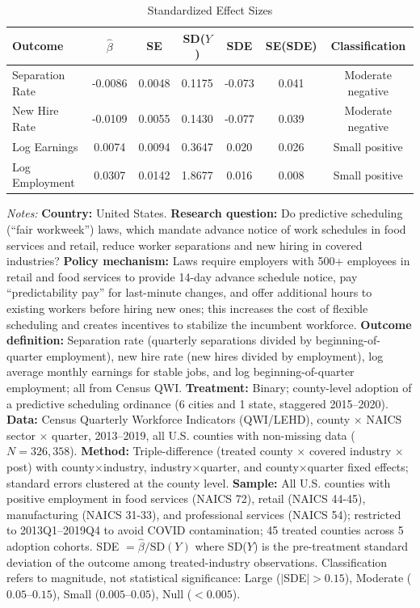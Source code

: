 \begin{table}[htbp]
\centering
\caption{Standardized Effect Sizes}
\label{tab:sde}
\begin{threeparttable}
\begin{tabular}{lcccccc}
\toprule
Outcome & $\hat{\beta}$ & SE & SD($Y$) & SDE & SE(SDE) & Classification \\
\midrule
Separation Rate & -0.0086 & 0.0048 & 0.1175 & -0.073 & 0.041 & Moderate negative \\
New Hire Rate & -0.0109 & 0.0055 & 0.1430 & -0.077 & 0.039 & Moderate negative \\
Log Earnings & 0.0074 & 0.0094 & 0.3647 & 0.020 & 0.026 & Small positive \\
Log Employment & 0.0307 & 0.0142 & 1.8677 & 0.016 & 0.008 & Small positive \\
\bottomrule
\end{tabular}
\begin{tablenotes}[flushleft]\small
\item \textit{Notes:} \textbf{Country:} United States. \textbf{Research question:} Do predictive scheduling (``fair workweek'') laws, which mandate advance notice of work schedules in food services and retail, reduce worker separations and new hiring in covered industries? \textbf{Policy mechanism:} Laws require employers with 500+ employees in retail and food services to provide 14-day advance schedule notice, pay ``predictability pay'' for last-minute changes, and offer additional hours to existing workers before hiring new ones; this increases the cost of flexible scheduling and creates incentives to stabilize the incumbent workforce. \textbf{Outcome definition:} Separation rate (quarterly separations divided by beginning-of-quarter employment), new hire rate (new hires divided by employment), log average monthly earnings for stable jobs, and log beginning-of-quarter employment; all from Census QWI. \textbf{Treatment:} Binary; county-level adoption of a predictive scheduling ordinance (6 cities and 1 state, staggered 2015--2020). \textbf{Data:} Census Quarterly Workforce Indicators (QWI/LEHD), county $\times$ NAICS sector $\times$ quarter, 2013--2019, all U.S. counties with non-missing data ($N = 326,358$). \textbf{Method:} Triple-difference (treated county $\times$ covered industry $\times$ post) with county$\times$industry, industry$\times$quarter, and county$\times$quarter fixed effects; standard errors clustered at the county level. \textbf{Sample:} All U.S. counties with positive employment in food services (NAICS 72), retail (NAICS 44-45), manufacturing (NAICS 31-33), and professional services (NAICS 54); restricted to 2013Q1--2019Q4 to avoid COVID contamination; 45 treated counties across 5 adoption cohorts. SDE $= \hat{\beta} / \text{SD}(Y)$ where SD($Y$) is the pre-treatment standard deviation of the outcome among treated-industry observations. Classification refers to magnitude, not statistical significance: Large ($|$SDE$| > 0.15$), Moderate ($0.05$--$0.15$), Small ($0.005$--$0.05$), Null ($< 0.005$).
\end{tablenotes}
\end{threeparttable}
\end{table}

